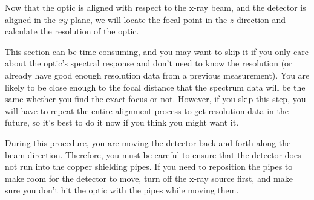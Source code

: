 Now that the optic is aligned with respect to the x-ray beam, and the detector is aligned in the $xy$ plane, we will locate the focal point in the $z$ direction and calculate the resolution of the optic.

This section can be time-consuming, and you may want to skip it if you only care about the optic's spectral response and don't need to know the resolution (or already have good enough resolution data from a previous measurement). You are likely to be close enough to the focal distance that the spectrum data will be the same whether you find the exact focus or not. However, if you skip this step, you will have to repeat the entire alignment process to get resolution data in the future, so it's best to do it now if you think you might want it.

During this procedure, you are moving the detector back and forth along the beam direction. Therefore, you must be careful to ensure that the detector does not run into the copper shielding pipes. If you need to reposition the pipes to make room for the detector to move, turn off the x-ray source first, and make sure you don't hit the optic with the pipes while moving them.

